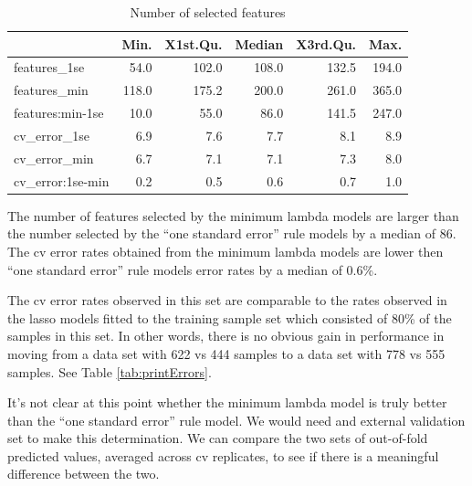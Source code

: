 \documentclass[
]{book}
\begin{document}
\begin{table}

\caption{\label{tab:hcc5hmC-glmnetSuite-model-size-lassoAll}Number of selected features}
\centering
\begin{tabular}[t]{l|r|r|r|r|r}
\hline
  & Min. & X1st.Qu. & Median & X3rd.Qu. & Max.\\
\hline
features\_1se & 54.0 & 102.0 & 108.0 & 132.5 & 194.0\\
\hline
features\_min & 118.0 & 175.2 & 200.0 & 261.0 & 365.0\\
\hline
features:min-1se & 10.0 & 55.0 & 86.0 & 141.5 & 247.0\\
\hline
cv\_error\_1se & 6.9 & 7.6 & 7.7 & 8.1 & 8.9\\
\hline
cv\_error\_min & 6.7 & 7.1 & 7.1 & 7.3 & 8.0\\
\hline
cv\_error:1se-min & 0.2 & 0.5 & 0.6 & 0.7 & 1.0\\
\hline
\end{tabular}
\end{table}

The number of features selected by the minimum lambda models are larger
than the number selected by the ``one standard error'' rule models by a median
of 86.
The cv error rates obtained from the minimum lambda models are lower
then ``one standard error'' rule models error rates by a median of
0.6\%.

The cv error rates observed in this set are comparable to the
rates observed in the lasso models fitted to the training sample set
which consisted of 80\% of the samples in this set. In other words,
there is no obvious gain in performance in moving from
a data set with
622 vs 444 samples
to a data set with
778 vs 555 samples.
See Table \ref{tab:printErrors}.

It's not clear at this point whether the minimum lambda model is truly better than
the ``one standard error'' rule model. We would need and external validation
set to make this determination. We can compare the two sets
of out-of-fold predicted values, averaged across cv replicates, to see if
there is a meaningful difference between the two.
\end{document}
